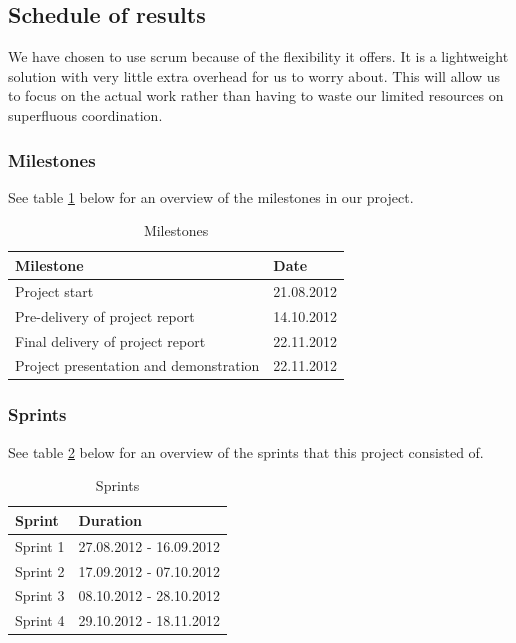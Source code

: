 \subsection{Schedule of results}
We have chosen to use scrum because of the flexibility it offers. It is a lightweight solution with very little extra overhead for us to worry about. This will allow us to focus on the actual work rather than having to waste our limited resources on superfluous coordination.

\subsubsection{Milestones}
See table \ref{tab:milestones} below for an overview of the milestones in our project.
\begin{table}[h!]
\begin{center}
\begin{tabular}{l|l} \hline
\textbf{Milestone} & \textbf{Date} \\ \hline \hline
Project start &  21.08.2012\\ 
Pre-delivery of project report & 14.10.2012\\ 
Final delivery of project report & 22.11.2012\\
Project presentation and demonstration & 22.11.2012\\ \hline
\end{tabular}
\end{center}
\caption{Milestones} \label{tab:milestones}
\end{table}


\subsubsection{Sprints}
See table \ref{tab:sprints} below for an overview of the sprints that this project consisted of.
\begin{table}[h!]
\begin{center}
\begin{tabular}{l|l} \hline
\textbf{Sprint} & \textbf{Duration} \\ \hline \hline
Sprint 1 &  27.08.2012 - 16.09.2012\\
Sprint 2 & 17.09.2012 - 07.10.2012\\
Sprint 3 & 08.10.2012 - 28.10.2012\\
Sprint 4 & 29.10.2012 - 18.11.2012\\ \hline
\end{tabular}
\end{center}
\caption{Sprints} \label{tab:sprints}
\end{table}

